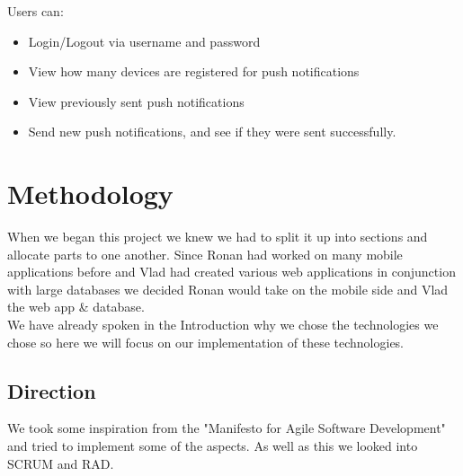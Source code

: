 Users can:
\begin{itemize}
\item Login/Logout via username and password
\item View how many devices are registered for push notifications
\item View previously sent push notifications
\item Send new push notifications, and see if they were sent successfully.
\end{itemize}


\chapter{Methodology}	%

When we began this project we knew we had to split it up into sections and allocate parts to one another.  
Since Ronan had worked on many mobile applications before and Vlad had created various web applications in conjunction with large databases we decided Ronan would take on the mobile side and Vlad the web app \& database.
\\

We have already spoken in the Introduction why we chose the technologies we chose so here we will focus on our implementation of these technologies.

\section{Direction}
We took some inspiration from the "Manifesto for Agile Software Development" and tried to implement some of the aspects.
As well as this we looked into SCRUM and RAD.

